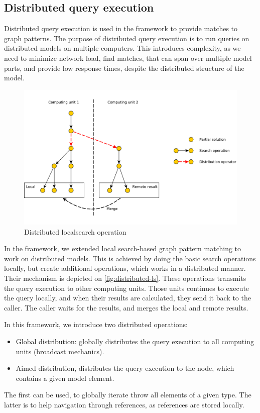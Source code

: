 \subsection{Distributed query execution}

Distributed query execution is used in the framework to provide matches to graph patterns.
The purpose of distributed query execution is to run queries on distributed models on multiple computers. 
This introduces complexity, as we need to minimize network load, find matches, that can span over multiple model parts, and provide low response times, despite the distributed structure of the model.


\begin{figure}[h]
	\begin{center}
		\includegraphics[width=\textwidth]{figures/distributed-ls.pdf}
		\caption{Distributed localsearch operation}
		\label{fig:distributed-ls}
	\end{center}
\end{figure}

In the framework, we extended local search-based graph pattern matching to work on distributed models.
This is achieved by doing the basic search operations locally, but create additional operations, which works in a distributed manner. 
Their mechanism is depicted on \autoref{fig:distributed-ls}.
These operations transmits the query execution to other computing units.
Those units continues to execute the query locally, and when their results are calculated, they send it back to the caller.
The caller waits for the results, and merges the local and remote results.

In this framework, we introduce two distributed operations:
\begin{itemize}
	\item Global distribution: globally distributes the query execution to all computing units (broadcast mechanics).
	\item Aimed distribution, distributes the query execution to the node, which contains a given model element.
\end{itemize}

The first can be used, to globally iterate throw all elements of a given type. The latter is to help navigation through references, as references are stored locally.





